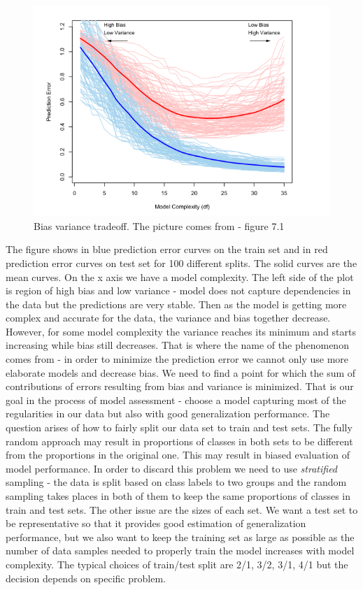 \documentclass[shortabstract, english, mgr]{iithesis}
\begin{document}
\begin{figure}
\centering
\includegraphics[width=\textwidth]{images/BiasVarianceTrade.png}
\caption{Bias variance tradeoff. The picture comes from \cite{ESL2} - figure 7.1}
\label{fig:biasVarTrade}
\end{figure}

The figure shows in blue prediction error curves on the train set and in red prediction error curves on test set for 100 different splits. The solid curves are the mean curves. On the x axis we have a model complexity. The left side of the plot is region of high bias and low variance - model does not capture dependencies in the data but the predictions are very stable. Then as the model is getting more complex and accurate for the data, the variance and bias together decrease. However, for some model complexity the variance reaches its minimum and starts increasing while bias still decreases. That is where the name of the phenomenon comes from - in order to minimize the prediction error we cannot only use more elaborate models and decrease bias. We need to find a point for which the sum of contributions of errors resulting from bias and variance is minimized. That is our goal in the process of model assessment - choose a model capturing most of the regularities in our data but also with good generalization performance. The question arises of how to fairly split our data set to train and test sets. The fully random approach may result in proportions of classes in both sets to be different from the proportions in the original one. This may result in biased evaluation of model performance. In order to discard this problem we need to use \textit{stratified} sampling - the data is split based on class labels to two groups and the random sampling takes places in both of them to keep the same proportions of classes in train and test sets. The other issue are the sizes of each set. We want a test set to be representative so that it provides good estimation of generalization performance, but we also want to keep the training set as large as possible as the number of data samples needed to properly train the model increases with model complexity.  The typical choices of train/test split are 2/1, 3/2, 3/1, 4/1 but the decision depends on specific problem.  
\end{document}

